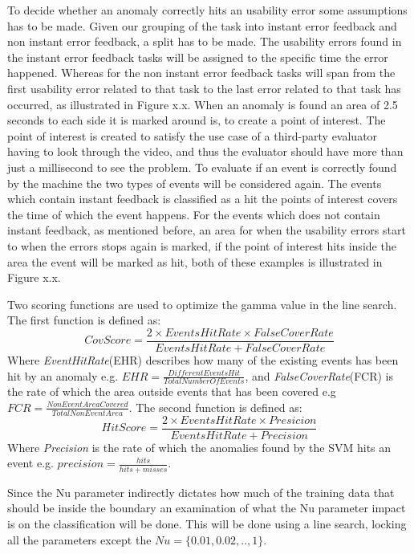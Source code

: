 To decide whether an anomaly correctly hits an usability error some assumptions has to be made. Given our grouping of the task into instant error feedback and non instant error feedback, a split has to be made. The usability errors found in the instant error feedback tasks will be assigned to the specific time the error happened. Whereas for the non instant error feedback tasks will span from the first usability error related to that task to the last error related to that task has occurred, as illustrated in Figure x.x.
When an anomaly is found an area of 2.5 seconds to each side it is marked around is, to create a point of interest. The point of interest is created to satisfy the use case of a third-party evaluator having to look through the video, and thus the evaluator should have more than just a millisecond to see the problem.
To evaluate if an event is correctly found by the machine the two types of events will be considered again.
The events which contain instant feedback is classified as a hit the points of interest covers the time of which the event happens.
For the events which does not contain instant feedback, as mentioned before, an area for when the usability errors start to when the errors stops again is marked, if the point of interest hits inside the area the event will be marked as hit, both of these examples is illustrated in Figure x.x. 

Two scoring functions are used to optimize the gamma value in the line search. The first function is defined as: 
\[CovScore = \frac{2 \times EventsHitRate \times FalseCoverRate}{EventsHitRate + FalseCoverRate}\]
Where \textit{EventHitRate}(EHR) describes how many of the existing events has been hit by an anomaly e.g. $EHR = \frac{DifferentEventsHit}{TotalNumberOfEvents}$, and \textit{FalseCoverRate}(FCR) is the rate of which the area outside events that has been covered e.g $FCR = \frac{NonEventAreaCovered}{TotalNonEventArea}$. 
The second function is defined as: 
\[HitScore = \frac{2 \times EventsHitRate \times Presicion}{EventsHitRate + Precision}\]
Where \textit{Precision} is the rate of which the anomalies found by the SVM hits an event e.g. $precision = \frac{hits}{hits+misses}$. 

Since the Nu parameter indirectly dictates how much of the training data that should be inside the boundary an examination of what the Nu parameter impact is on the classification will be done.
This will be done using a line search, locking all the parameters except the $Nu = \{0.01, 0.02,.., 1\}$. 

